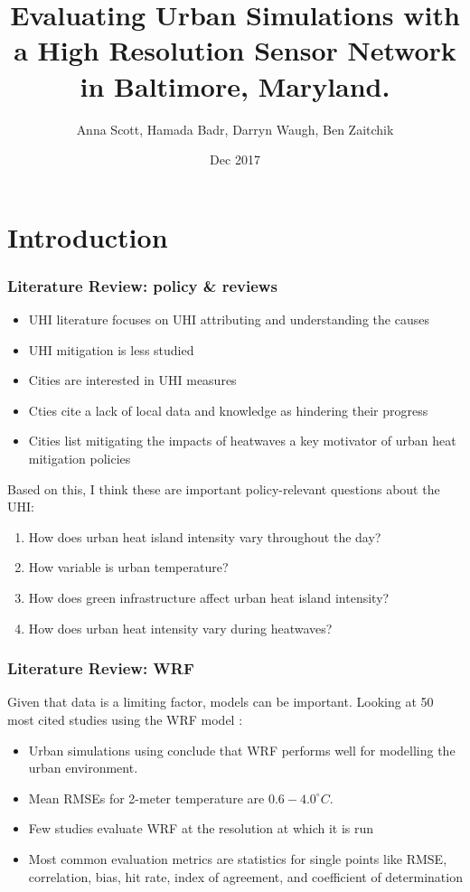 \documentclass[aspectratio=169, 10pt]{beamer}
\title{Evaluating Urban Simulations with a High Resolution Sensor Network in Baltimore, Maryland.}
\subtitle{}
\date{Dec 2017}
\author{Anna Scott, Hamada Badr, Darryn Waugh, Ben Zaitchik}
\institute{annascott@jhu.edu }
\begin{document}
\maketitle



\section{Introduction}

\begin{frame}
\frametitle{Literature Review: policy \& reviews}
\begin{itemize}
\item UHI literature focuses on UHI attributing and understanding the causes \item UHI mitigation is less studied 
\item Cities are interested in UHI measures
\item Cties cite a lack of local data and knowledge as hindering their progress %
\item Cities list mitigating the impacts of heatwaves a key motivator of urban heat mitigation policies %
\end{itemize}
\end{frame}

\begin{frame}
Based on this, I think these are important policy-relevant questions about the UHI:  
\begin{enumerate}
\item How does urban heat island intensity vary throughout the day? 
\item How variable is urban temperature? 
\item How does green infrastructure affect urban heat island intensity? 
\item How does urban heat intensity vary during heatwaves? 
\end{enumerate}
\end{frame}

\begin{frame}[label=intro]
\frametitle{Literature Review: WRF}
\centering
Given that data is a limiting factor, models can be important. Looking at 50 most cited studies using  the WRF model :
\begin{itemize}
\item Urban simulations using conclude that WRF performs well for modelling the urban environment. 

\item Mean RMSEs for 2-meter temperature are $0.6-4.0^\circ C$.
 
\item Few studies evaluate WRF at the resolution at which it is run 

\item Most common evaluation metrics are statistics for single points like RMSE, correlation, bias, hit rate, index of agreement, and coefficient of determination
\end{itemize}

\end{frame}
\end{document}
